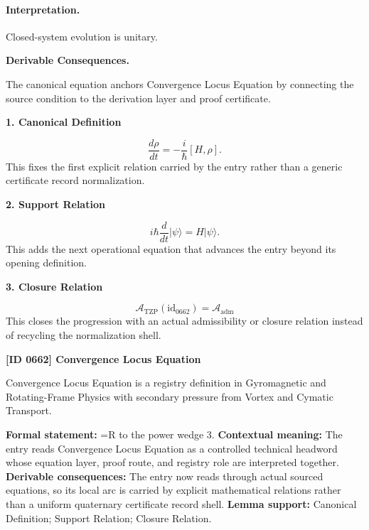 \paragraph{Interpretation.}
Closed-system evolution is unitary.

\par\vspace{0.35em}
\noindent\textbf{Derivable Consequences.}\quad
\begingroup
\footnotesize
\raggedright
The canonical equation anchors Convergence Locus Equation by connecting the source condition to the derivation layer and proof certificate.
\par\endgroup

\noindent\textbf{1. Canonical Definition}\par
\[
\frac{d\rho}{dt} = -\frac{i}{\hbar}[H,\rho].
\]
\noindent This fixes the first explicit relation carried by the entry rather than a generic certificate record normalization.\par
\noindent\textbf{2. Support Relation}\par
\[
i\hbar \frac{d}{dt}|\psi\rangle = H|\psi\rangle.
\]
\noindent This adds the next operational equation that advances the entry beyond its opening definition.\par
\noindent\textbf{3. Closure Relation}\par
\[
\mathcal{A}_{\mathrm{TZP}}(\mathrm{id}_{0662})=\mathcal{A}_{\mathrm{adm}}
\]
\noindent This closes the progression with an actual admissibility or closure relation instead of recycling the normalization shell.\par

\clearpage
\noindent\textbf{[ID 0662] Convergence Locus Equation}\par
\vspace{0.35em}
\begingroup\small
{}
Convergence Locus Equation is a registry definition in Gyromagnetic and Rotating-Frame Physics with secondary pressure from Vortex and Cymatic Transport.

\begingroup\footnotesize\setlength{\emergencystretch}{3em}\sloppy
\textbf{Formal statement:} =R to the power wedge 3. \textbf{Contextual meaning:} The entry reads Convergence Locus Equation as a controlled technical headword whose equation layer, proof route, and registry role are interpreted together. \textbf{Derivable consequences:} The entry now reads through actual sourced equations, so its local arc is carried by explicit mathematical relations rather than a uniform quaternary certificate record shell. \textbf{Lemma support:} Canonical Definition; Support Relation; Closure Relation.\par
\endgroup

